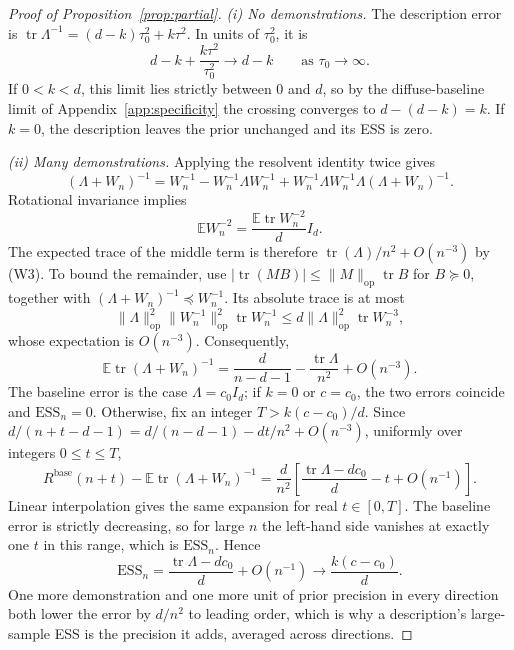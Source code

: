 \documentclass{article}
\theoremstyle{definition}
\newcommand{\ess}{\mathrm{ESS}}
\newcommand{\E}{\mathbb{E}}
\begin{document}
\begin{proof}[Proof of Proposition~\ref{prop:partial}]
\emph{(i) No demonstrations.}
The description error is $\operatorname{tr}\Lambda^{-1}=(d-k)\tau_0^2+k\tau^2$. In units of $\tau_0^2$, it is
\[
d-k+\frac{k\tau^2}{\tau_0^2}\longrightarrow d-k
\qquad\text{as }\tau_0\to\infty.
\]
If $0<k<d$, this limit lies strictly between $0$ and $d$, so by the diffuse-baseline limit of Appendix~\ref{app:specificity} the crossing converges to $d-(d-k)=k$. If $k=0$, the description leaves the prior unchanged and its ESS is zero.

\emph{(ii) Many demonstrations.}
Applying the resolvent identity twice gives
\[
(\Lambda+W_n)^{-1}
=W_n^{-1}-W_n^{-1}\Lambda W_n^{-1}
+W_n^{-1}\Lambda W_n^{-1}\Lambda(\Lambda+W_n)^{-1}.
\]
Rotational invariance implies
\[
\E W_n^{-2}=\frac{\E\operatorname{tr}W_n^{-2}}{d}I_d.
\]
The expected trace of the middle term is therefore
$\operatorname{tr}(\Lambda)/n^2+O(n^{-3})$ by (W3). To bound the remainder, use $|\operatorname{tr}(MB)|\le\|M\|_{\mathrm{op}}\operatorname{tr}B$ for $B\succeq0$, together with $(\Lambda+W_n)^{-1}\preceq W_n^{-1}$. Its absolute trace is at most
\[
\|\Lambda\|_{\mathrm{op}}^2\|W_n^{-1}\|_{\mathrm{op}}^2\operatorname{tr}W_n^{-1}
\le d\|\Lambda\|_{\mathrm{op}}^2\operatorname{tr}W_n^{-3},
\]
whose expectation is $O(n^{-3})$. Consequently,
\[
\E\operatorname{tr}(\Lambda+W_n)^{-1}
=\frac{d}{n-d-1}-\frac{\operatorname{tr}\Lambda}{n^2}+O(n^{-3}).
\]
The baseline error is the case $\Lambda=c_0I_d$; if $k=0$ or $c=c_0$, the two errors coincide and $\ess_n=0$. Otherwise, fix an integer $T>k(c-c_0)/d$. Since $d/(n+t-d-1)=d/(n-d-1)-dt/n^2+O(n^{-3})$, uniformly over integers $0\le t\le T$,
\[
R^{\mathrm{base}}(n+t)-\E\operatorname{tr}(\Lambda+W_n)^{-1}
=\frac{d}{n^2}\left[\frac{\operatorname{tr}\Lambda-dc_0}{d}-t+O(n^{-1})\right].
\]
Linear interpolation gives the same expansion for real $t\in[0,T]$. The baseline error is strictly decreasing, so for large $n$ the left-hand side vanishes at exactly one $t$ in this range, which is $\ess_n$. Hence
\[
\ess_n=\frac{\operatorname{tr}\Lambda-dc_0}{d}+O(n^{-1})
\longrightarrow\frac{k(c-c_0)}{d}.
\]
One more demonstration and one more unit of prior precision in every direction both lower the error by $d/n^2$ to leading order, which is why a description's large-sample ESS is the precision it adds, averaged across directions.
\end{proof}

\begin{table}[t]
\centering\small
\setlength{\tabcolsep}{3pt}
\caption{\textbf{Demonstrations can increase the value of a specific partial description.} Bayes-optimal ESS for a reliable description of $k$ of $d=16$ directions, with $\tau_0^2=10$ and precision $c=\tau^{-2}$. The case $k=16$ is a complete description. Each block reports ESS after $n$ demonstrations and its large-sample limit $(c-c_0)k/d$. Estimates use eight batches of $2{,}000$ prompts; standard errors are at most $0.05$.}
\label{tab:partial}
\vspace{3pt}

\end{table}
\end{document}
